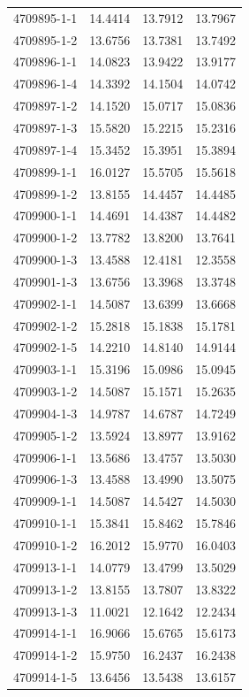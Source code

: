 \begin{longtable}{lrrr}
4709895-1-1 & 14.4414 & 13.7912 & 13.7967 \\
4709895-1-2 & 13.6756 & 13.7381 & 13.7492 \\
4709896-1-1 & 14.0823 & 13.9422 & 13.9177 \\
4709896-1-4 & 14.3392 & 14.1504 & 14.0742 \\
4709897-1-2 & 14.1520 & 15.0717 & 15.0836 \\
4709897-1-3 & 15.5820 & 15.2215 & 15.2316 \\
4709897-1-4 & 15.3452 & 15.3951 & 15.3894 \\
4709899-1-1 & 16.0127 & 15.5705 & 15.5618 \\
4709899-1-2 & 13.8155 & 14.4457 & 14.4485 \\
4709900-1-1 & 14.4691 & 14.4387 & 14.4482 \\
4709900-1-2 & 13.7782 & 13.8200 & 13.7641 \\
4709900-1-3 & 13.4588 & 12.4181 & 12.3558 \\
4709901-1-3 & 13.6756 & 13.3968 & 13.3748 \\
4709902-1-1 & 14.5087 & 13.6399 & 13.6668 \\
4709902-1-2 & 15.2818 & 15.1838 & 15.1781 \\
4709902-1-5 & 14.2210 & 14.8140 & 14.9144 \\
4709903-1-1 & 15.3196 & 15.0986 & 15.0945 \\
4709903-1-2 & 14.5087 & 15.1571 & 15.2635 \\
4709904-1-3 & 14.9787 & 14.6787 & 14.7249 \\
4709905-1-2 & 13.5924 & 13.8977 & 13.9162 \\
4709906-1-1 & 13.5686 & 13.4757 & 13.5030 \\
4709906-1-3 & 13.4588 & 13.4990 & 13.5075 \\
4709909-1-1 & 14.5087 & 14.5427 & 14.5030 \\
4709910-1-1 & 15.3841 & 15.8462 & 15.7846 \\
4709910-1-2 & 16.2012 & 15.9770 & 16.0403 \\
4709913-1-1 & 14.0779 & 13.4799 & 13.5029 \\
4709913-1-2 & 13.8155 & 13.7807 & 13.8322 \\
4709913-1-3 & 11.0021 & 12.1642 & 12.2434 \\
4709914-1-1 & 16.9066 & 15.6765 & 15.6173 \\
4709914-1-2 & 15.9750 & 16.2437 & 16.2438 \\
4709914-1-5 & 13.6456 & 13.5438 & 13.6157 \\

\end{longtable}
